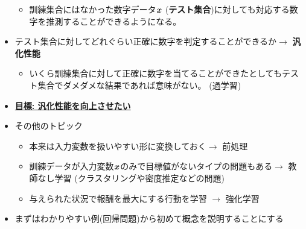 \documentclass[a4j,11pt]{jarticle}
\def\v#1{\mbox{\boldmath $#1$}}
\begin{document}
\begin{itemize}
\begin{itemize}
			\item 訓練集合にはなかった数字データ$\v{x}$ (\textbf{テスト集合})に対しても対応する数字を推測することができるようになる。
		\end{itemize}
	\item テスト集合に対してどれぐらい正確に数字を判定することができるか$\rightarrow$ \textbf{汎化性能}
		\begin{itemize}
			\item いくら訓練集合に対して正確に数字を当てることができたとしてもテスト集合でダメダメな結果であれば意味がない。 (過学習)
		\end{itemize}
	\item \textbf{\underline{目標: 汎化性能を向上させたい}}
	\item その他のトピック
		\begin{itemize}
			\item 本来は入力変数を扱いやすい形に変換しておく$\rightarrow$ 前処理
			\item 訓練データが入力変数$\v{x}$のみで目標値がないタイプの問題もある$\rightarrow$ 教師なし学習 (クラスタリングや密度推定などの問題)
			\item 与えられた状況で報酬を最大にする行動を学習 $\rightarrow$ 強化学習
		\end{itemize}
	\item まずはわかりやすい例(回帰問題)から初めて概念を説明することにする
\end{itemize}
\end{document}
